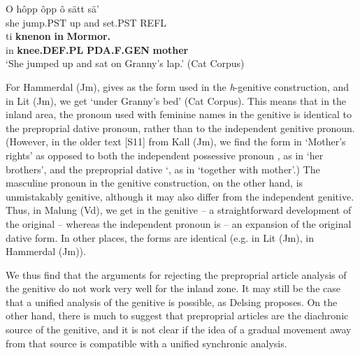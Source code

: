 {\ea\label{}
\gll O  hôpp  ôpp  ô  sätt  sä’  \\
she  jump.PST  up  and  set.PST  REFL  \\
\gll ti  \textbf{knenon} \textbf{in} \textbf{Mormor.}\\
in  \textbf{knee.DEF.PL} \textbf{PDA.F.GEN} \textbf{mother}\\
\glt ‘She jumped up and sat on Granny’s lap.’ (Cat Corpus)
\z

For Hammerdal (Jm), \citet{Reinhammar2005} gives  as the form used in the \textit{h}{}-genitive construction, and in Lit (Jm), we get  ‘under Granny’s bed’ (Cat Corpus). This means that in the inland area, the pronoun used with feminine names in the genitive is identical to the preproprial dative pronoun, rather than to the independent genitive pronoun. (However, in the older text [S11] from Kall (Jm), we find the form  in  ‘Mother’s rights’ as opposed to both the independent possessive pronoun , as in  ‘her brothers’, and the preproprial dative ‘, as in  ‘together with mother’.) The masculine pronoun in the genitive construction, on the other hand, is unmistakably genitive, although it may also differ from the independent genitive. Thus, in Malung (Vd), we get  in the genitive – a straightforward development of the original  – whereas the independent pronoun is  – an expansion of the original dative form. In other places, the forms are identical (e.g.  in Lit (Jm),  in Hammerdal (Jm)). 


We thus find that the arguments for rejecting the preproprial article analysis of the genitive do not work very well for the inland zone. It may still be the case that a unified analysis of the genitive is possible, as Delsing proposes. On the other hand, there is much to suggest that preproprial articles are the diachronic source of the genitive, and it is not clear if the idea of a gradual movement away from that source is compatible with a unified synchronic analysis. 

}
